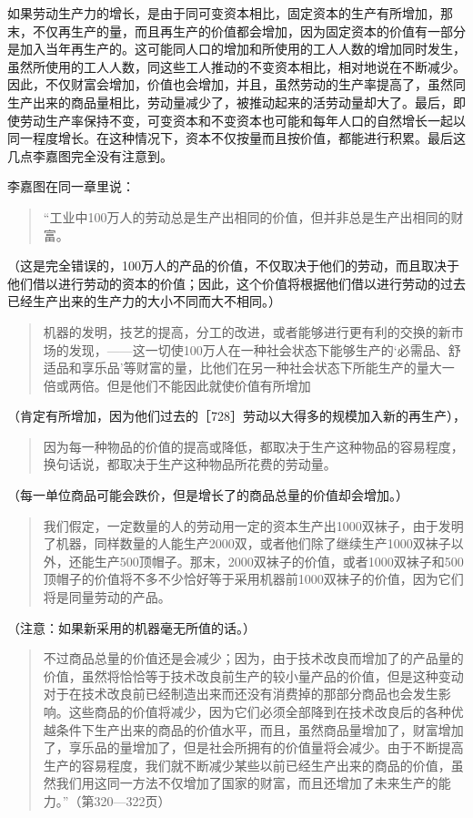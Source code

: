 如果劳动生产力的增长，是由于同可变资本相比，固定资本的生产有所增加，那末，不仅再生产的量，而且再生产的价值都会增加，因为固定资本的价值有一部分是加入当年再生产的。这可能同人口的增加和所使用的工人人数的增加同时发生，虽然所使用的工人人数，同这些工人推动的不变资本相比，相对地说在不断减少。因此，不仅财富会增加，价值也会增加，并且，虽然劳动的生产率提高了，虽然同生产出来的商品量相比，劳动量减少了，被推动起来的活劳动量却大了。最后，即使劳动生产率保持不变，可变资本和不变资本也可能和每年人口的自然增长一起以同一程度增长。在这种情况下，资本不仅按量而且按价值，都能进行积累。最后这几点李嘉图完全没有注意到。

李嘉图在同一章里说：

\begin{quote}{“工业中100万人的劳动总是生产出相同的价值，但并非总是生产出相同的财富。}\end{quote}

（这是完全错误的，100万人的产品的价值，不仅取决于他们的劳动，而且取决于他们借以进行劳动的资本的价值；因此，这个价值将根据他们借以进行劳动的过去已经生产出来的生产力的大小不同而大不相同。）

\begin{quote}{机器的发明，技艺的提高，分工的改进，或者能够进行更有利的交换的新市场的发现，——这一切使100万人在一种社会状态下能够生产的‘必需品、舒适品和享乐品’等财富的量，比他们在另一种社会状态下所能生产的量大一倍或两倍。但是他们不能因此就使价值有所增加}\end{quote}

（肯定有所增加，因为他们过去的［728］劳动以大得多的规模加入新的再生产），

\begin{quote}{因为每一种物品的价值的提高或降低，都取决于生产这种物品的容易程度，换句话说，都取决于生产这种物品所花费的劳动量。}\end{quote}

（每一单位商品可能会跌价，但是增长了的商品总量的价值却会增加。）

\begin{quote}{我们假定，一定数量的人的劳动用一定的资本生产出1000双袜子，由于发明了机器，同样数量的人能生产2000双，或者他们除了继续生产1000双袜子以外，还能生产500顶帽子。那末，2000双袜子的价值，或者1000双袜子和500顶帽子的价值将不多不少恰好等于采用机器前1000双袜子的价值，因为它们将是同量劳动的产品。}\end{quote}

（注意：如果新采用的机器毫无所值的话。）

\begin{quote}{不过商品总量的价值还是会减少；因为，由于技术改良而增加了的产品量的价值，虽然将恰恰等于技术改良前生产的较小量产品的价值，但是这种变动对于在技术改良前已经制造出来而还没有消费掉的那部分商品也会发生影响。这些商品的价值将减少，因为它们必须全部降到在技术改良后的各种优越条件下生产出来的商品的价值水平，而且，虽然商品量增加了，财富增加了，享乐品的量增加了，但是社会所拥有的价值量将会减少。由于不断提高生产的容易程度，我们就不断减少某些以前已经生产出来的商品的价值，虽然我们用这同一方法不仅增加了国家的财富，而且还增加了未来生产的能力。”（第320—322页）}\end{quote}

